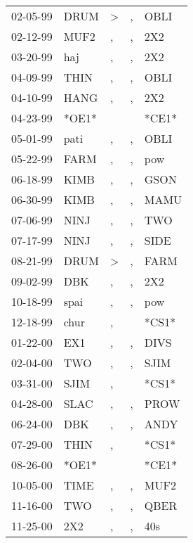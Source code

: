 \begin{supertabular}{lllll}
 02-05-99 &   DRUM &  \textgreater &             , &   OBLI \\
 02-12-99 &   MUF2 &             , &             , &    2X2 \\
 03-20-99 &    haj &             , &             , &    2X2 \\
 04-09-99 &   THIN &             , &             , &   OBLI \\
 04-10-99 &   HANG &             , &             , &    2X2 \\
 04-23-99 &  *OE1* &               &               &  *CE1* \\
 05-01-99 &   pati &             , &             , &   OBLI \\
 05-22-99 &   FARM &             , &             , &    pow \\
 06-18-99 &   KIMB &             , &             , &   GSON \\
 06-30-99 &   KIMB &             , &             , &   MAMU \\
 07-06-99 &   NINJ &             , &             , &    TWO \\
 07-17-99 &   NINJ &             , &             , &   SIDE \\
 08-21-99 &   DRUM &  \textgreater &             , &   FARM \\
 09-02-99 &    DBK &             , &             , &    2X2 \\
 10-18-99 &   spai &             , &             , &    pow \\
 12-18-99 &   chur &             , &               &  *CS1* \\
 01-22-00 &    EX1 &             , &             , &   DIVS \\
 02-04-00 &    TWO &             , &             , &   SJIM \\
 03-31-00 &   SJIM &             , &               &  *CS1* \\
 04-28-00 &   SLAC &             , &             , &   PROW \\
 06-24-00 &    DBK &             , &             , &   ANDY \\
 07-29-00 &   THIN &             , &               &  *CS1* \\
 08-26-00 &  *OE1* &               &               &  *CE1* \\
 10-05-00 &   TIME &             , &             , &   MUF2 \\
 11-16-00 &    TWO &             , &             , &   QBER \\
 11-25-00 &    2X2 &             , &             , &    40s \\

\end{supertabular}
